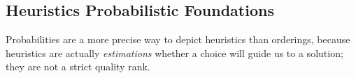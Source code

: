 \documentclass{ws-ijait}
\begin{document}
%


\subsection{Heuristics Probabilistic Foundations}

Probabilities are a more precise way to depict heuristics than orderings, because heuristics are actually \emph{estimations} whether a choice will guide us to a solution; they are not a strict quality rank.
\end{document}
